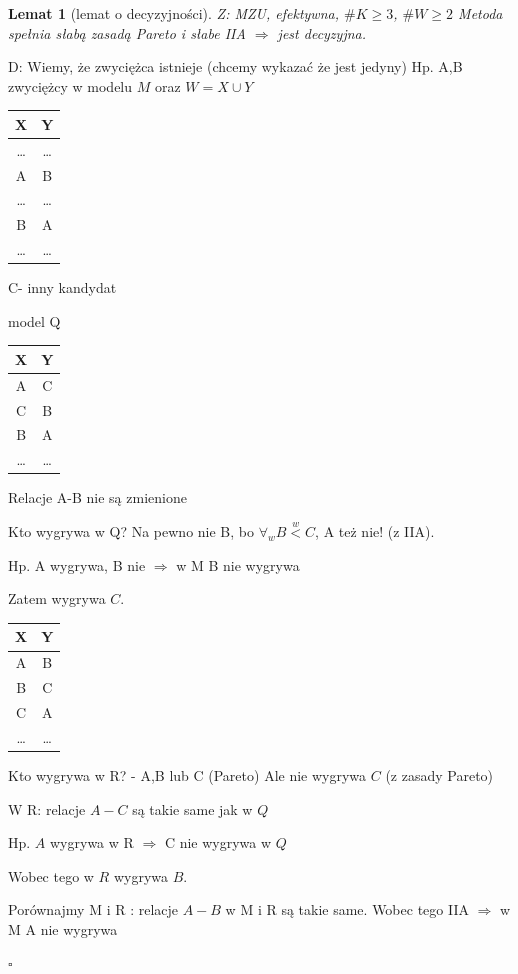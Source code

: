\documentclass[12pt,a4paper]{article}
\theoremstyle{break}
\newtheorem{lemma}{Lemat}[section]
\begin{document}
		\begin{lemma}[lemat o decyzyjności]
			Z: MZU, efektywna, $\#K\geq3$, $\#W\geq2$
			Metoda spełnia słabą zasadą Pareto i słabe IIA
			$\Rightarrow$ jest decyzyjna.
		\end{lemma}
		D: Wiemy, że zwyciężca istnieje (chcemy wykazać że jest jedyny)
		Hp. A,B zwyciężcy w modelu $M$ oraz
		$W=X\cup Y$ \begin{tabular}{|c|c|}\hline
			X & Y \\\hline
			\dots & \dots \\\hline
			A & B \\\hline
			\dots & \dots \\\hline
			B & A \\\hline
			\dots & \dots \\\hline
		\end{tabular} 
		C- inny kandydat
		
		model Q
		\begin{tabular}{|c|c|}\hline
			X & Y \\\hline
			A & C\\\hline
			C & B \\\hline
			B & A \\\hline
			\dots & \dots \\\hline
		\end{tabular} 
		Relacje A-B nie są zmienione
		
		Kto wygrywa w Q?
		Na pewno nie B, bo $\forall_w B\overset{w}{<}C$, A też nie! (z IIA).
		
		Hp. A wygrywa, B nie $\Rightarrow$ w M B nie wygrywa \faBolt
		
		Zatem wygrywa $C$.
		
			\begin{tabular}{|c|c|}\hline
				X & Y \\\hline
				A & B\\\hline
				B & C \\\hline
				C & A \\\hline
				\dots & \dots \\\hline
			\end{tabular}
		Kto wygrywa w R? - A,B lub C (Pareto)
		Ale nie wygrywa $C$ (z zasady Pareto)
		
		W R: relacje $A-C$ są takie same jak w $Q$
		
		Hp. $A$ wygrywa w R $\Rightarrow$ C nie wygrywa w $Q$
		
		Wobec tego w $R$ wygrywa $B$.
		
		Porównajmy M i R : relacje $A-B$ w M i R są takie same. Wobec tego IIA $\Rightarrow$ w M A nie wygrywa \faBolt
				\begin{flushright}$\square$\end{flushright}
				
\end{document}
